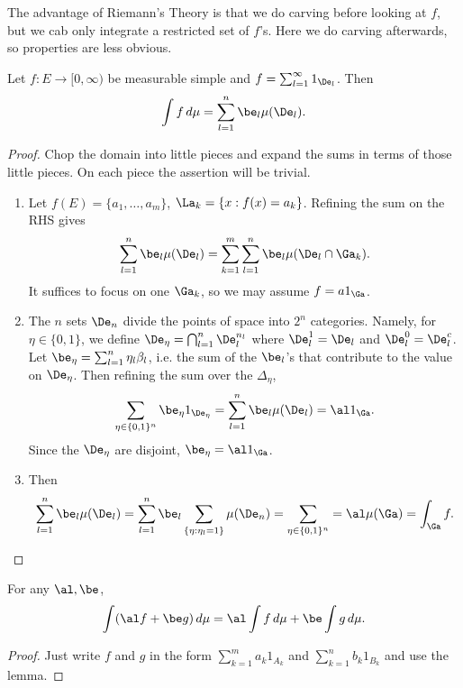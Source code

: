 The advantage of Riemann's Theory is that we do carving before looking at $f$, but we cab only integrate a restricted set of $f$'s. Here we do carving afterwards, so properties are less obvious.
\begin{lem}
Let $f:E\to [0,\infty)$ be measurable simple and $f=\sum_{l=1}^{\infty}1_{\De_l}$. Then
\[
\int f\,d\mu =\sum_{l=1}^n \be_l \mu(\De_l).
\] 
\end{lem}
\begin{proof}
Chop the domain into little pieces and expand the sums in terms of those little pieces. On each piece the assertion will be trivial.
\begin{enumerate}
\item
Let $f(E)=\{a_1,\ldots, a_m\}$, $\La_k=\{x:f(x)=a_k\}$. Refining the sum on the RHS gives
\[
\sum_{l=1}^n \be_l \mu(\De_l)=\sum_{k=1}^m\sum_{l=1}^n \be_l\mu(\De_l\cap \Ga_k).
\]
It suffices to focus on one $\Ga_k$, so we may assume $f=a 1_{\Ga}$.
\item
The $n$ sets $\De_n$ divide the points of space into $2^n$ categories. Namely, for $\eta\in \{0,1\}$, we define $\De_{\eta}=\bigcap_{l=1}^n \De_l^{n_l}$ where $\De_l^{1}=\De_l$ and $\De_l^0=\De_l^c$. Let $\be_{\eta}=\sum_{l=1}^n \eta_l\beta_l$, i.e. the sum of the $\be_l$'s that contribute to the value on $\De_{\eta}$. Then refining the sum over the $\Delta_{\eta}$,
\[
\sum_{\eta\in \{0,1\}^n} \be_{\eta}1_{\De_{\eta}}
=\sum_{l=1}^n \be_l \mu(\De_l)
=\al 1_{\Ga}.
\]
Since the $\De_{\eta}$ are disjoint, $\be_{\eta}=\al1_{\Ga}$.
\item Then
\[
\sum_{l=1}^n \be_l\mu(\De_l)=\sum_{l=1}^n \be_l\sum_{\{\eta:\eta_l=1\}} \mu(\De_n)=\sum_{\eta\in \{0,1\}^n}=\al\mu(\Ga)=\int_{\Ga} f.
\]
\end{enumerate}
\end{proof}
\begin{pr}
For any $\al, \be$,
\[\int (\al f+\be g)\,d\mu=\al\int f \,d\mu+\be\int g\,d\mu.\]
\end{pr}
\begin{proof}
Just write $f$ and $g$ in the form $\sum_{k=1}^m a_k1_{A_k}$ and $\sum_{k=1}^n b_k1_{B_k}$ and use the lemma.
\end{proof}
